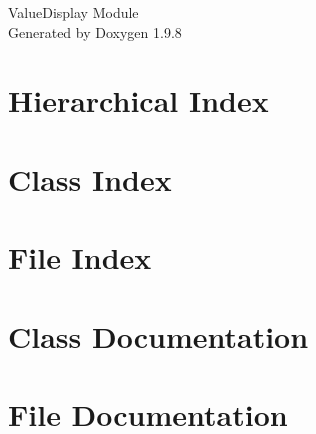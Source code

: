 \documentclass[twoside]{book}
\newcommand{\+}{\discretionary{\mbox{\scriptsize$\hookleftarrow$}}{}{}}
\newcommand{\clearemptydoublepage}{%
    \newpage{\pagestyle{empty}\cleardoublepage}%
  }
\begin{document}
  \raggedbottom
    \hypersetup{pageanchor=false,
                bookmarksnumbered=true,
                pdfencoding=unicode
               }
  \begin{titlepage}
  \vspace*{7cm}
  \begin{center}%
  {\Large Value\+Display Module}\\
  \vspace*{1cm}
  {\large Generated by Doxygen 1.9.8}\\
  \end{center}
  \end{titlepage}
  \clearemptydoublepage
  \tableofcontents
  \clearemptydoublepage
  \hypersetup{pageanchor=true}

\chapter{Hierarchical Index}

\chapter{Class Index}

\chapter{File Index}

\chapter{Class Documentation}





\chapter{File Documentation}















  \backmatter
  \newpage
  \clearemptydoublepage
  \printindex
\end{document}
